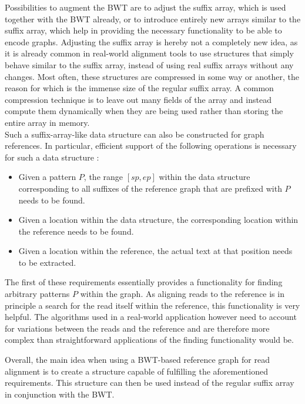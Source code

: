 \documentclass[a4paper,12pt,twoside,BCOR=10mm]{scrbook}
\begin{document}
Possibilities to augment the BWT are to adjust the suffix array,
which is used together with the BWT already,
or to introduce entirely new arrays similar to the suffix array,
which help in providing the necessary functionality to be able to encode graphs.
Adjusting the suffix array is hereby not a completely new idea,
as it is already common in real-world alignment tools
to use structures that simply behave similar to the suffix array,
instead of using real suffix arrays without any changes.
Most often, these structures are compressed in some way or another,
the reason for which is the immense size of the regular suffix array.
A common compression technique is to leave out many fields of the array
and instead compute them dynamically
when they are being used rather than storing the entire array in memory. \\
Such a suffix-array-like data structure can also be constructed for graph references.
In particular, efficient support of the following operations is necessary for such a data structure \citep{Siren2014}:

\begin{itemize}
\item Given a pattern $ P $, the range $ [sp, ep] $ within the data structure
corresponding to all suffixes of the reference graph that are prefixed with $ P $ needs to be found.
\item Given a location within the data structure, the corresponding location within the
reference needs to be found.
\item Given a location within the reference, the actual text at that position
needs to be extracted.
\end{itemize}

The first of these requirements
essentially provides a functionality for finding arbitrary patterns $ P $ within the graph.
As aligning reads to the reference
is in principle a search for the read itself within the reference,
this functionality is very helpful.
The algorithms used in a real-world application however need to
account for variations between the reads and the reference and
are therefore more complex than straightforward applications
of the finding functionality would be.

Overall, the main idea when using a BWT-based reference graph for read alignment
is to create a structure capable of fulfilling the aforementioned requirements.
This structure can then be used instead of the regular suffix array
in conjunction with the BWT.
\end{document}
